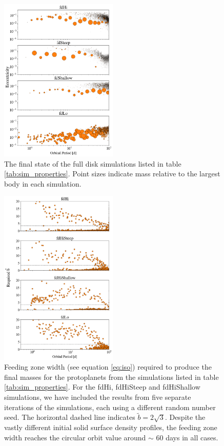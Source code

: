 \begin{figure}
\begin{center}
    \includegraphics[width=0.5\textwidth]{figures/plStip/surfden_profiles.png}
    \caption{The final state of the full disk simulations listed in table \ref{tab:sim_properties}. 
    Point sizes indicate mass relative to the largest body in each simulation.\label{fig:surfden_profiles}}
\end{center}
\end{figure}

\begin{figure}
\begin{center}
    \includegraphics[width=0.5\textwidth]{figures/plStip/surfden_b.png}
    \caption{Feeding zone width (see equation \ref{eq:iso}) required to produce the final masses for the protoplanets from the 
    simulations listed in table \ref{tab:sim_properties}. For the fdHi, fdHiSteep and fdHiShallow simulations, we have included the results from five separate iterations of the simulations, each using a different random number seed. The horizontal dashed line indicates $\tilde{b} = 2 \sqrt{3}$. Despite the 
    vastly different initial solid surface density profiles, the feeding zone width reaches the circular orbit value around $\sim$ 60 
    days in all cases. \label{fig:surfden_b}}
\end{center}
\end{figure}


